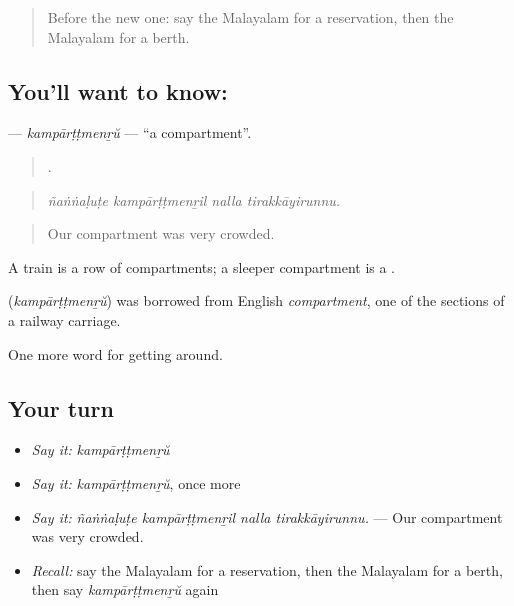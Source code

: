 \label{lesson:ML-C462-kamparttmenru}



\begin{quote}
Before the new one: say the Malayalam for a reservation, then the Malayalam for a berth.
\end{quote}

\subsection*{You'll want to know: }
\textbf{} — \emph{kampārṭṭmenṟŭ} — \textquotedblleft{}a compartment\textquotedblright{}.

\begin{quote}
   .
\end{quote}

\begin{quote}
\emph{ñaṅṅaḷuṭe kampārṭṭmenṟil nalla tirakkāyirunnu.}
\end{quote}

\begin{quote}
Our compartment was very crowded.
\end{quote}

A train is a row of compartments; a sleeper compartment is a  .

\begin{cousinweb}
\textbf{} (\emph{kampārṭṭmenṟŭ}) was borrowed from English \emph{compartment}, one of the sections of a railway carriage.
\end{cousinweb}

\begin{grammarlens}[title={What you've built}]
One more word for getting around.
\end{grammarlens}

\subsection*{Your turn}
\begin{itemize}
\raggedright
  \item \emph{Say it:} \emph{kampārṭṭmenṟŭ}
  \item \emph{Say it:} \emph{kampārṭṭmenṟŭ}, once more
  \item \emph{Say it:} \emph{ñaṅṅaḷuṭe kampārṭṭmenṟil nalla tirakkāyirunnu.} — Our compartment was very crowded.
  \item \emph{Recall:} say the Malayalam for a reservation, then the Malayalam for a berth, then say \emph{kampārṭṭmenṟŭ} again
\end{itemize}

